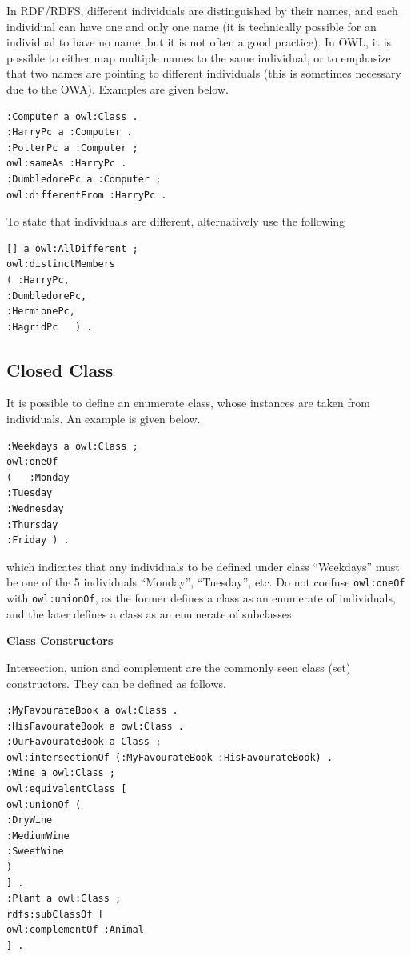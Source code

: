 In RDF/RDFS, different individuals are distinguished by their names, and each individual can have one and only one name (it is technically possible for an individual to have no name, but it is not often a good practice). In OWL, it is possible to either map multiple names to the same individual, or to emphasize that two names are pointing to different individuals (this is sometimes necessary due to the OWA). Examples are given below.
\begin{lstlisting}
:Computer a owl:Class .
:HarryPc a :Computer .
:PotterPc a :Computer ;
owl:sameAs :HarryPc .
:DumbledorePc a :Computer ;
owl:differentFrom :HarryPc .
\end{lstlisting}
To state that individuals are different, alternatively use the following
\begin{lstlisting}
[] a owl:AllDifferent ;
owl:distinctMembers
( :HarryPc,
:DumbledorePc,
:HermionePc,
:HagridPc	) .
\end{lstlisting}

\subsection{Closed Class}

It is possible to define an enumerate class, whose instances are taken from individuals. An example is given below.
\begin{lstlisting}
:Weekdays a owl:Class ;
owl:oneOf
(	:Monday
:Tuesday
:Wednesday
:Thursday
:Friday ) .
\end{lstlisting}
which indicates that any individuals to be defined under class ``Weekdays'' must be one of the 5 individuals ``Monday'', ``Tuesday'', etc. Do not confuse \verb|owl:oneOf| with \verb|owl:unionOf|, as the former defines a class as an enumerate of individuals, and the later defines a class as an enumerate of subclasses.

\vspace{0.1in}
\noindent \textbf{Class Constructors}
\vspace{0.1in}

Intersection, union and complement are the commonly seen class (set) constructors. They can be defined as follows.
\begin{lstlisting}
:MyFavourateBook a owl:Class .
:HisFavourateBook a owl:Class .
:OurFavourateBook a Class ;
owl:intersectionOf (:MyFavourateBook :HisFavourateBook) .
:Wine a owl:Class ;
owl:equivalentClass [
owl:unionOf (
:DryWine
:MediumWine
:SweetWine
)
] .
:Plant a owl:Class ;
rdfs:subClassOf [
owl:complementOf :Animal
] .
\end{lstlisting}

